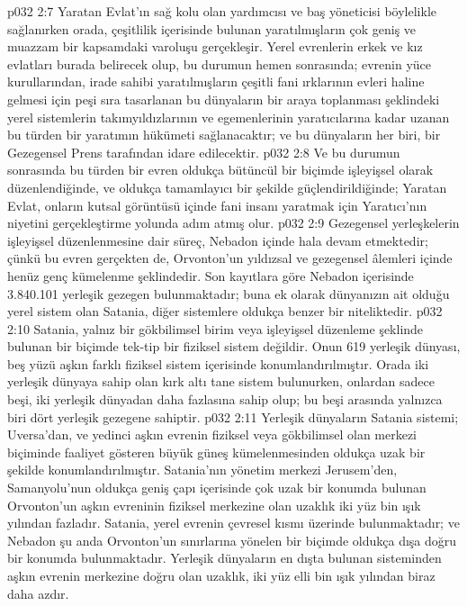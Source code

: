 \vs p032 2:7 Yaratan Evlat’ın sağ kolu olan yardımcısı ve baş yöneticisi böylelikle sağlanırken orada, çeşitlilik içerisinde bulunan yaratılmışların çok geniş ve muazzam bir kapsamdaki varoluşu gerçekleşir. Yerel evrenlerin erkek ve kız evlatları burada belirecek olup, bu durumun hemen sonrasında; evrenin yüce kurullarından, irade sahibi yaratılmışların çeşitli fani ırklarının evleri haline gelmesi için peşi sıra tasarlanan bu dünyaların bir araya toplanması şeklindeki yerel sistemlerin takımyıldızlarının ve egemenlerinin yaratıcılarına kadar uzanan bu türden bir yaratımın hükümeti sağlanacaktır; ve bu dünyaların her biri, bir Gezegensel Prens tarafından idare edilecektir.
\vs p032 2:8 Ve bu durumun sonrasında bu türden bir evren oldukça bütüncül bir biçimde işleyişsel olarak düzenlendiğinde, ve oldukça tamamlayıcı bir şekilde güçlendirildiğinde; Yaratan Evlat, onların kutsal görüntüsü içinde fani insanı yaratmak için Yaratıcı’nın niyetini gerçekleştirme yolunda adım atmış olur.
\vs p032 2:9 Gezegensel yerleşkelerin işleyişsel düzenlenmesine dair süreç, Nebadon içinde hala devam etmektedir; çünkü bu evren gerçekten de, Orvonton’un yıldızsal ve gezegensel âlemleri içinde henüz genç kümelenme şeklindedir. Son kayıtlara göre Nebadon içerisinde 3.840.101 yerleşik gezegen bulunmaktadır; buna ek olarak dünyanızın ait olduğu yerel sistem olan Satania, diğer sistemlere oldukça benzer bir niteliktedir.
\vs p032 2:10 Satania, yalnız bir gökbilimsel birim veya işleyişsel düzenleme şeklinde bulunan bir biçimde tek\hyp{}tip bir fiziksel sistem değildir. Onun 619 yerleşik dünyası, beş yüzü aşkın farklı fiziksel sistem içerisinde konumlandırılmıştır. Orada iki yerleşik dünyaya sahip olan kırk altı tane sistem bulunurken, onlardan sadece beşi, iki yerleşik dünyadan daha fazlasına sahip olup; bu beşi arasında yalnızca biri dört yerleşik gezegene sahiptir.
\vs p032 2:11 Yerleşik dünyaların Satania sistemi; Uversa’dan, ve yedinci aşkın evrenin fiziksel veya gökbilimsel olan merkezi biçiminde faaliyet gösteren büyük güneş kümelenmesinden oldukça uzak bir şekilde konumlandırılmıştır. Satania’nın yönetim merkezi Jerusem’den, Samanyolu’nun oldukça geniş çapı içerisinde çok uzak bir konumda bulunan Orvonton’un aşkın evreninin fiziksel merkezine olan uzaklık iki yüz bin ışık yılından fazladır. Satania, yerel evrenin çevresel kısmı üzerinde bulunmaktadır; ve Nebadon şu anda Orvonton’un sınırlarına yönelen bir biçimde oldukça dışa doğru bir konumda bulunmaktadır. Yerleşik dünyaların en dışta bulunan sisteminden aşkın evrenin merkezine doğru olan uzaklık, iki yüz elli bin ışık yılından biraz daha azdır.
